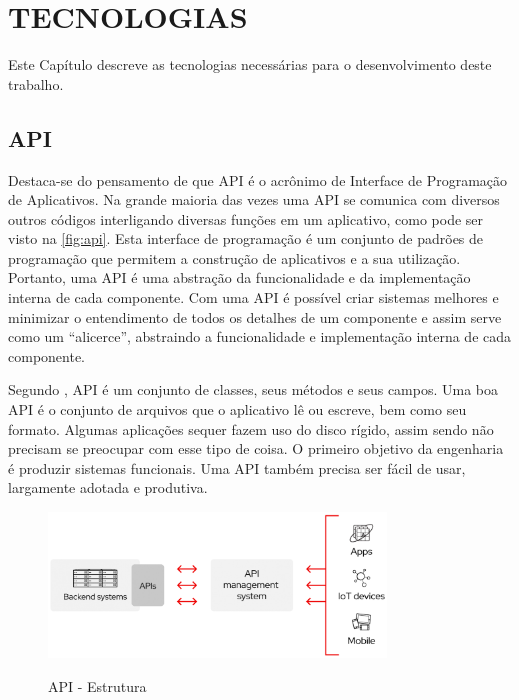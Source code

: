 
\chapter{TECNOLOGIAS}

Este Capítulo descreve as tecnologias necessárias para o desenvolvimento deste trabalho.

\section{API}
Destaca-se do pensamento de  que API é o acrônimo de Interface de Programação de Aplicativos. Na grande maioria das vezes uma API se comunica com diversos outros códigos interligando diversas funções em um aplicativo, como pode ser visto na \autoref{fig:api}. Esta interface de programação é um conjunto de padrões de programação que permitem a construção de aplicativos e a sua utilização. Portanto, uma API é uma abstração da funcionalidade e da implementação interna de cada componente. Com uma API é possível criar sistemas melhores e minimizar o entendimento de todos os detalhes de um componente e assim serve como um “alicerce”, abstraindo a funcionalidade e implementação interna de cada componente.

Segundo , API é um conjunto de classes, seus métodos e seus campos.
Uma boa API é o conjunto de arquivos que o aplicativo lê ou escreve, bem como seu formato. Algumas aplicações sequer fazem uso do disco rígido, assim sendo não precisam se preocupar com esse tipo de coisa. O primeiro objetivo da engenharia é produzir sistemas funcionais. Uma API também precisa ser fácil de usar, largamente adotada e produtiva.

\begin{figure}[H]
    \centering
    \caption{API -  Estrutura}
    \includegraphics[width=0.8\textwidth]{./dados/figuras/fig10}
    \label{fig:api}
\end{figure}

